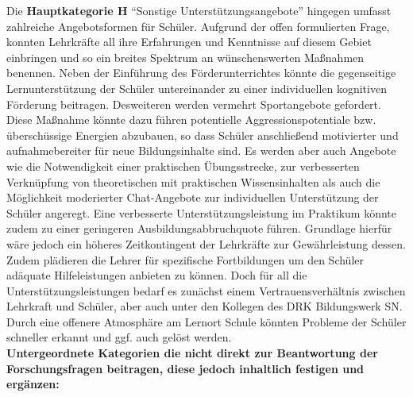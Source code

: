 \noindent
Die \textbf{Hauptkategorie H} "`Sonstige Unterstützungsangebote"' hingegen umfasst zahlreiche Angebotsformen für Schüler. Aufgrund der offen formulierten Frage, konnten Lehrkräfte all ihre Erfahrungen und Kenntnisse auf diesem Gebiet einbringen und so ein breites Spektrum an wünschenswerten Maßnahmen benennen. Neben der Einführung des Förderunterrichtes könnte die gegenseitige Lernunterstützung der Schüler untereinander zu einer individuellen kognitiven Förderung beitragen. Desweiteren werden vermehrt Sportangebote gefordert. Diese Maßnahme könnte dazu führen potentielle Aggressionspotentiale bzw. überschüssige Energien abzubauen, so dass Schüler anschließend motivierter und aufnahmebereiter für neue Bildungsinhalte sind. Es werden aber auch Angebote wie die Notwendigkeit einer praktischen Übungsstrecke, zur verbesserten Verknüpfung von theoretischen mit praktischen Wissensinhalten als auch die Möglichkeit moderierter Chat-Angebote zur individuellen Unterstützung der Schüler angeregt. Eine verbesserte Unterstützungsleistung im Praktikum könnte zudem zu einer geringeren Ausbildungsabbruchquote führen. Grundlage hierfür wäre jedoch ein höheres Zeitkontingent der Lehrkräfte zur Gewährleistung dessen. Zudem plädieren die Lehrer für spezifische Fortbildungen um den Schüler adäquate Hilfeleistungen anbieten zu können. Doch für all die Unterstützungsleistungen bedarf es zunächst einem Vertrauensverhältnis zwischen Lehrkraft und Schüler, aber auch unter den Kollegen des DRK Bildungswerk SN. Durch eine offenere Atmosphäre am Lernort Schule könnten Probleme der Schüler schneller erkannt und ggf. auch gelöst werden.\\

\noindent
\textbf{Untergeordnete Kategorien die nicht direkt zur Beantwortung der Forschungsfragen beitragen, diese jedoch inhaltlich festigen und ergänzen:}\\

